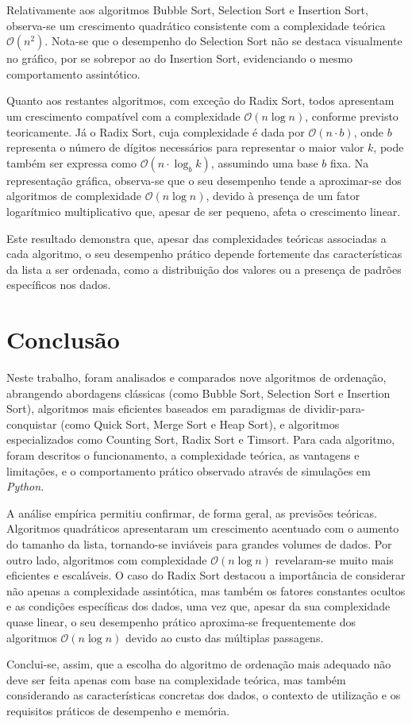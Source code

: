 \documentclass[conference]{IEEEtran}
\begin{document}
Relativamente aos algoritmos Bubble Sort, Selection Sort e Insertion Sort, observa-se um crescimento quadrático consistente com a complexidade teórica \( \mathcal{O}(n^2) \). Nota-se que o desempenho do Selection Sort não se destaca visualmente no gráfico, por se sobrepor ao do Insertion Sort, evidenciando o mesmo comportamento assintótico.

Quanto aos restantes algoritmos, com exceção do Radix Sort, todos apresentam um crescimento compatível com a complexidade \( \mathcal{O}(n \log n) \), conforme previsto teoricamente. Já o Radix Sort, cuja complexidade é dada por \( \mathcal{O}(n \cdot b) \), onde \( b \) representa o número de dígitos necessários para representar o maior valor \( k \), pode também ser expressa como \( \mathcal{O}(n \cdot \log_b k) \), assumindo uma base \( b \) fixa. Na representação gráfica, observa-se que o seu desempenho tende a aproximar-se dos algoritmos de complexidade \( \mathcal{O}(n \log n) \), devido à presença de um fator logarítmico multiplicativo que, apesar de ser pequeno, afeta o crescimento linear.

Este resultado demonstra que, apesar das complexidades teóricas associadas a cada algoritmo, o seu desempenho prático depende fortemente das características da lista a ser ordenada, como a distribuição dos valores ou a presença de padrões específicos nos dados.

\section{Conclusão}

Neste trabalho, foram analisados e comparados nove algoritmos de ordenação, abrangendo abordagens clássicas (como Bubble Sort, Selection Sort e Insertion Sort), algoritmos mais eficientes baseados em paradigmas de dividir-para-conquistar (como Quick Sort, Merge Sort e Heap Sort), e algoritmos especializados como Counting Sort, Radix Sort e Timsort. Para cada algoritmo, foram descritos o funcionamento, a complexidade teórica, as vantagens e limitações, e o comportamento prático observado através de simulações em \textit{Python}.

A análise empírica permitiu confirmar, de forma geral, as previsões teóricas. Algoritmos quadráticos apresentaram um crescimento acentuado com o aumento do tamanho da lista, tornando-se inviáveis para grandes volumes de dados. Por outro lado, algoritmos com complexidade \( \mathcal{O}(n \log n) \) revelaram-se muito mais eficientes e escaláveis. O caso do Radix Sort destacou a importância de considerar não apenas a complexidade assintótica, mas também os fatores constantes ocultos e as condições específicas dos dados, uma vez que, apesar da sua complexidade quase linear, o seu desempenho prático aproxima-se frequentemente dos algoritmos \( \mathcal{O}(n \log n) \) devido ao custo das múltiplas passagens.

Conclui-se, assim, que a escolha do algoritmo de ordenação mais adequado não deve ser feita apenas com base na complexidade teórica, mas também considerando as características concretas dos dados, o contexto de utilização e os requisitos práticos de desempenho e memória.

\nocite{*}


\end{document}

